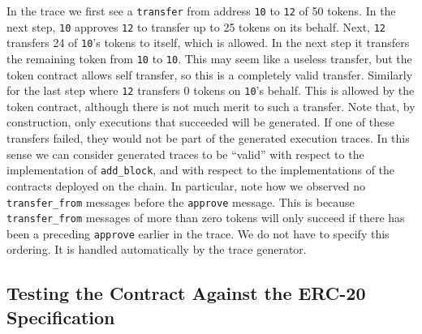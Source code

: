 \documentclass[twoside,11pt,openright]{report}
\newcommand{\coq}[1]{\texttt{#1}}
\begin{document}
In the trace we first see a \coq{transfer} from address \coq{10} to \coq{12} of 50 tokens. In the next step, \coq{10} approves \coq{12} to transfer up to 25 tokens on its behalf. Next, \coq{12} transfers 24 of \coq{10}'s tokens to itself, which is allowed. In the next step it transfers the remaining token from \coq{10} to \coq{10}. This may seem like a useless transfer, but the token contract allows self transfer, so this is a completely valid transfer. Similarly for the last step where \coq{12} transfers 0 tokens on \coq{10}'s behalf. This is allowed by the token contract, although there is not much merit to such a transfer. Note that, by construction, only executions that succeeded will be generated. If one of these transfers failed, they would not be part of the generated execution traces. In this sense we can consider generated traces to be ``valid'' with respect to the implementation of \coq{add\_block}, and with respect to the implementations of the contracts deployed on the chain. In particular, note how we observed no \coq{transfer\_from} messages before the \coq{approve} message. This is because \coq{transfer\_from} messages of more than zero tokens will only succeed if there has been a preceding \coq{approve} earlier in the trace. We do not have to specify this ordering. It is handled automatically by the trace generator.

\subsection{Testing the Contract Against the ERC-20 Specification}
\end{document}
